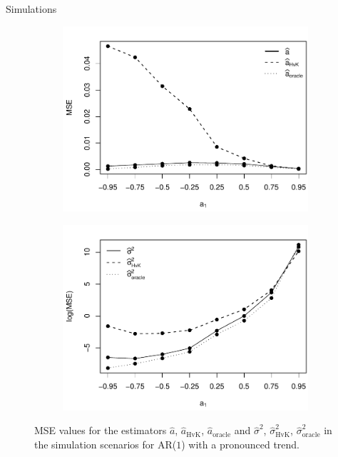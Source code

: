 \documentclass[10pt, handout]{beamer}
\begin{document}
\begin{frame}{Simulations}

\begin{figure}[t!]
\begin{subfigure}[b]{0.475\textwidth}
\includegraphics[width=\textwidth]{MSE_a1_T=500_slope=10_(q,r,M1,M2)=(25,10,20,30).pdf}
\end{subfigure}\hspace{0.25cm}
\begin{subfigure}[b]{0.475\textwidth}
\includegraphics[width=\textwidth]{MSE_lrv_T=500_slope=10_(q,r,M1,M2)=(25,10,20,30).pdf}
\end{subfigure}
\caption{MSE values for the estimators $\widehat{a}$, $\widehat{a}_{\text{HvK}}$, $\widehat{a}_{\text{oracle}}$ and $\widehat{\sigma}^2$, $\widehat{\sigma}^2_{\text{HvK}}$, $\widehat{\sigma}^2_{\text{oracle}}$ in the simulation scenarios for AR($1$) with a pronounced trend.%
}\label{fig:MSE_slope10}
\end{figure}
\end{frame}
\end{document}
